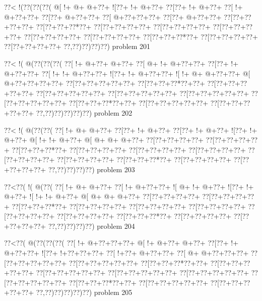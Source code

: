 \vbox{\vbox{\goo
\0??<\- !(\0??(\0??(\0??(
\- @[\- !+\- @+\- @+\0??+
\- ![\0??+\- !+\- @+\0??+
\0??[\0??+\- !+\- @+\0??+
\0??[\- !+\- @+\0??+\0??+
\0??[\0??+\- @+\0??+\0??+
\0??[\- @+\0??+\0??+\0??+
\0??[\0??+\- @+\0??+\0??+
\0??[\0??+\0??+\0??+\0??+
\0??[\0??+\0??+\0??*\0??+
\0??[\0??+\0??+\0??+\0??+
\0??[\0??+\0??+\0??+\0??+
\0??[\0??+\0??+\0??+\0??+
\0??[\0??+\0??+\0??+\0??+
\0??[\0??+\0??+\0??+\0??+
\0??[\0??+\0??+\0??*\0??+
\0??[\0??+\0??+\0??+\0??+
\0??[\0??+\0??+\0??+\0??+
\0??,\0??)\0??)\0??)\0??)
}
\hfil problem 201\hfil\break
}

\vbox{\vbox{\goo
\0??<\- !(\- @(\0??(\0??(\0??(
\0??[\- !+\- @+\0??+\- @+\0??+
\0??[\- @+\- !+\- @+\0??+\0??+
\0??[\0??+\- !+\- @+\0??+\0??+
\0??[\- !+\- !+\- @+\0??+\0??+
\- ![\0??+\- !+\- @+\0??+\0??+
\- ![\- !+\- @+\- @+\0??+\0??+
\- @[\- @+\0??+\0??+\0??+\0??+
\0??[\0??+\0??+\0??+\0??+\0??+
\0??[\0??+\0??+\0??*\0??+\0??+
\0??[\0??+\0??+\0??+\0??+\0??+
\0??[\0??+\0??+\0??+\0??+\0??+
\0??[\0??+\0??+\0??+\0??+\0??+
\0??[\0??+\0??+\0??+\0??+\0??+
\0??[\0??+\0??+\0??+\0??+\0??+
\0??[\0??+\0??+\0??*\0??+\0??+
\0??[\0??+\0??+\0??+\0??+\0??+
\0??[\0??+\0??+\0??+\0??+\0??+
\0??,\0??)\0??)\0??)\0??)\0??)
}
\hfil problem 202\hfil\break
}

\vbox{\vbox{\goo
\0??<\- !(\- @(\0??(\0??(
\0??[\- !+\- @+\- @+\0??+
\0??[\0??+\- !+\- @+\0??+
\0??[\0??+\- !+\- @+\0??+
\- ![\0??+\- !+\- @+\0??+
\- @[\- !+\- !+\- @+\0??+
\- @[\- @+\- @+\- @+\0??+
\0??[\0??+\0??+\0??+\0??+
\0??[\0??+\0??+\0??+\0??+
\0??[\0??+\0??+\0??*\0??+
\0??[\0??+\0??+\0??+\0??+
\0??[\0??+\0??+\0??+\0??+
\0??[\0??+\0??+\0??+\0??+
\0??[\0??+\0??+\0??+\0??+
\0??[\0??+\0??+\0??+\0??+
\0??[\0??+\0??+\0??*\0??+
\0??[\0??+\0??+\0??+\0??+
\0??[\0??+\0??+\0??+\0??+
\0??,\0??)\0??)\0??)\0??)
}
\hfil problem 203\hfil\break
}

\vbox{\vbox{\goo
\0??<\0??(\- !(\- @(\0??(
\0??[\- !+\- @+\- @+\0??+
\0??[\- !+\- @+\0??+\0??+
\- ![\- @+\- !+\- @+\0??+
\- ![\0??+\- !+\- @+\0??+
\- ![\- !+\- !+\- @+\0??+
\- @[\- @+\- @+\- @+\0??+
\0??[\0??+\0??+\0??+\0??+
\0??[\0??+\0??+\0??+\0??+
\0??[\0??+\0??+\0??*\0??+
\0??[\0??+\0??+\0??+\0??+
\0??[\0??+\0??+\0??+\0??+
\0??[\0??+\0??+\0??+\0??+
\0??[\0??+\0??+\0??+\0??+
\0??[\0??+\0??+\0??+\0??+
\0??[\0??+\0??+\0??*\0??+
\0??[\0??+\0??+\0??+\0??+
\0??[\0??+\0??+\0??+\0??+
\0??,\0??)\0??)\0??)\0??)
}
\hfil problem 204\hfil\break
}

\vbox{\vbox{\goo
\0??<\0??(\- @(\0??(\0??(\0??(
\0??[\- !+\- @+\0??+\0??+\0??+
\- @[\- !+\- @+\0??+\- @+\0??+
\0??[\0??+\- !+\- @+\0??+\0??+
\- ![\0??+\- !+\0??+\0??+\0??+
\0??[\- !+\0??+\- @+\0??+\0??+
\0??[\- @+\- @+\0??+\0??+\0??+
\0??[\0??+\0??+\0??+\0??+\0??+
\0??[\0??+\0??+\0??+\0??+\0??+
\0??[\0??+\0??+\0??*\0??+\0??+
\0??[\0??+\0??+\0??+\0??+\0??+
\0??[\0??+\0??+\0??+\0??+\0??+
\0??[\0??+\0??+\0??+\0??+\0??+
\0??[\0??+\0??+\0??+\0??+\0??+
\0??[\0??+\0??+\0??+\0??+\0??+
\0??[\0??+\0??+\0??*\0??+\0??+
\0??[\0??+\0??+\0??+\0??+\0??+
\0??[\0??+\0??+\0??+\0??+\0??+
\0??,\0??)\0??)\0??)\0??)\0??)
}
\hfil problem 205\hfil\break
}

